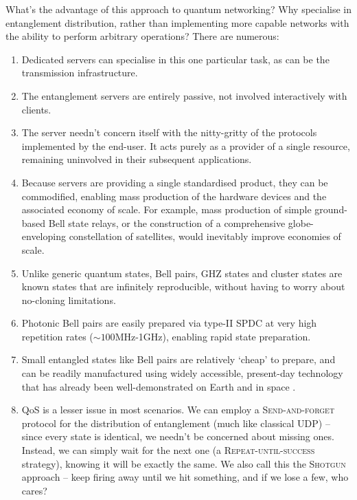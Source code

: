 What's the advantage of this approach to quantum networking? Why specialise in entanglement distribution, rather than implementing more capable networks with the ability to perform arbitrary operations? There are numerous:
\begin{enumerate}
\item Dedicated servers can specialise in this one particular task, as can be the transmission infrastructure.
\item The entanglement servers are entirely passive, not involved interactively with clients.
\item The server needn't concern itself with the nitty-gritty of the protocols implemented by the end-user. It acts purely as a provider of a single resource, remaining uninvolved in their subsequent applications.
\item Because servers are providing a single standardised product, they can be commodified, enabling mass production of the hardware devices and the associated economy of scale. For example, mass production of simple ground-based Bell state relays, or the construction of a comprehensive globe-enveloping constellation of satellites, would inevitably improve economies of scale.
\item Unlike generic quantum states, Bell pairs, GHZ states and cluster states are known states that are infinitely reproducible, without having to worry about no-cloning limitations.
\item Photonic Bell pairs are easily prepared via type-II SPDC at very high repetition rates (\mbox{$\sim 100$MHz-1GHz}), enabling rapid state preparation.
\item Small entangled states like Bell pairs are relatively `cheap' to prepare, and can be readily manufactured using widely accessible, present-day technology that has already been well-demonstrated on Earth and in space \cite{???}.
\item QoS is a lesser issue in most scenarios. We can employ a \textsc{Send-and-forget} protocol for the distribution of entanglement (much like classical UDP) -- since every state is identical, we needn't be concerned about missing ones. Instead, we can simply wait for the next one (a \textsc{Repeat-until-success} strategy), knowing it will be exactly the same. We also call this the \textsc{Shotgun} approach -- keep firing away until we hit something, and if we lose a few, who cares?

\end{enumerate}
